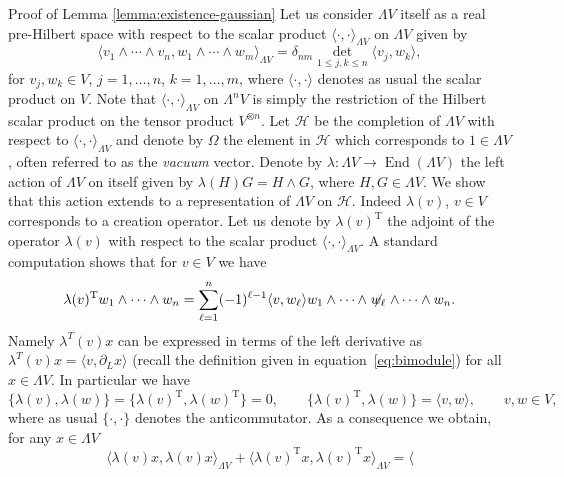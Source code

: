 \documentclass{article}
\newcommand{\Tau}{\mathrm{T}}
\newcommand{\tmop}[1]{\ensuremath{\operatorname{#1}}}
\newcommand{\tmtextit}[1]{{\itshape{#1}}}
\newenvironment{proof*}[1]{\noindent\textbf{#1\ }}{\hspace*{\fill}$\Box$\medskip}
\begin{document}
\begin{proof*}{Proof of Lemma \ref{lemma:existence-gaussian}}
  Let us consider $\Lambda V$ itself as a real pre-Hilbert space with respect
  to the scalar product $\langle \cdot, \cdot \rangle_{\Lambda V}$ on $\Lambda
  V$ given by
  \[ \langle v_1 \wedge \cdots \wedge v_n, w_1 \wedge \cdots \wedge w_m
     \rangle_{\Lambda V} = \delta_{n m} \underset{1 \leqslant j, k \leqslant
     n}{\det} \langle v_j, w_k \rangle, \]
  for $v_j, w_k \in V$, $j = 1, \ldots, n$, $k = 1, \ldots, m$, where $\langle
  \cdot, \cdot \rangle$ denotes as usual the scalar product on $V$. Note that
  $\langle \cdot, \cdot \rangle_{\Lambda V}$ on $\Lambda^n V$ is simply the
  restriction of the Hilbert scalar product on the tensor product $V^{\otimes
  n}$. Let $\mathcal{H}$ be the completion of $\Lambda V$ with respect to
  $\langle \cdot, \cdot \rangle_{\Lambda V}$ and denote by $\Omega$ the
  element in $\mathcal{H}$ which corresponds to $1 \in \Lambda V$, often
  referred to as the \tmtextit{vacuum} vector. Denote by $\lambda : \Lambda V
  \rightarrow \tmop{End} (\Lambda V)$ the left action of $\Lambda V$ on itself
  given by $\lambda (H) G = H \wedge G$, where $H, G \in \Lambda V$. We show
  that this action extends to a representation of $\Lambda V$ on
  $\mathcal{H}$. Indeed $\lambda (v)$, $v \in V$ corresponds to a creation
  operator. Let us denote by $\lambda (v)^{\Tau}$ the adjoint of the operator
  $\lambda (v)$ with respect to the scalar product $\langle \cdot, \cdot
  \rangle_{\Lambda V}$. A standard computation shows that for $v \in V$ we
  have
  \[ \lambda (v)^{\Tau} w_1 \wedge \cdots \wedge w_n = \sum_{\ell = 1}^n (-
     1)^{\ell - 1} \langle v, w_{\ell} \rangle w_1 \wedge \cdots \wedge
     \centernot{w_{\ell}} \wedge \cdots \wedge w_n . \]
  Namely $\lambda^T (v) x$ can be expressed in terms of the left derivative as
  $\lambda^T (v) x = \langle v, \partial_L x \rangle$ (recall the definition
  given in equation~{\eqref{eq:bimodule}}) for all $x \in \Lambda V$. In
  particular we have
  \begin{equation}
    \{ \lambda (v), \lambda (w) \} = \{ \lambda (v)^{\Tau}, \lambda (w)^{\Tau}
    \} = 0, \qquad \{ \lambda (v)^{\Tau}, \lambda (w) \} = \langle v, w
    \rangle, \qquad v, w \in V, \label{eq:car}
  \end{equation}
  where as usual $\{ \cdot, \cdot \}$ denotes the anticommutator. As a
  consequence we obtain, for any $x \in \Lambda V$
  \[ \langle \lambda (v) x, \lambda (v) x \rangle_{\Lambda V} + \langle
     \lambda (v)^{\Tau} x, \lambda (v)^{\Tau} x \rangle_{\Lambda V} = \langle
\]
\end{proof*}
\end{document}
